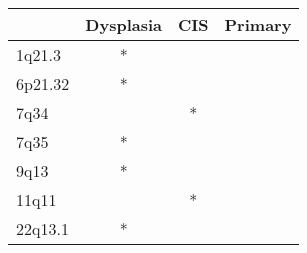 \begin{tabular}{lccc}
\toprule
{} & Dysplasia & CIS & Primary \\
\midrule
1q21.3  &         * &     &         \\
6p21.32 &         * &     &         \\
7q34    &           &   * &         \\
7q35    &         * &     &         \\
9q13    &         * &     &         \\
11q11   &           &   * &         \\
22q13.1 &         * &     &         \\
\bottomrule
\end{tabular}

